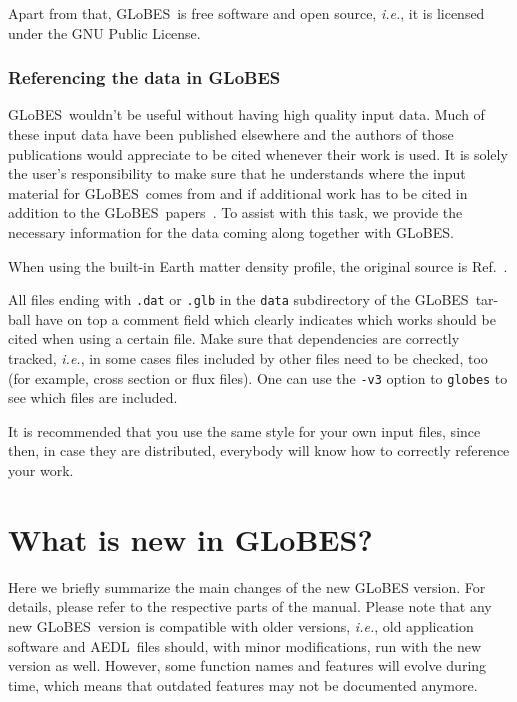 \documentclass[a4paper,12pt,twoside]{book}
\newcommand{\ie}{{\it i.e.}}
\newcommand{\Ref}{Ref.}
\newcommand{\GLOBES}{{\sf GLoBES}}
\newcommand{\AEDL}{{\sf AEDL}}
\begin{document}
Apart from that, \GLOBES\ is free software and open source, \ie, it is 
licensed under the GNU Public License.

\subsection*{Referencing the data in \GLOBES}
\label{ref_data}

\index{norm}{Referencing!data in \GLOBES}
\GLOBES\ wouldn't be useful without having high quality input data.
Much of these input data have been published elsewhere and the authors
of those publications would appreciate to be cited whenever their work
is used. It is solely the user's responsibility 
to make sure that he understands where the input material for \GLOBES\ comes
from and if additional work has to be cited in addition to the 
\GLOBES\ papers~\cite{globes_paper,globes_paper_two}. To assist with this task, we provide  the necessary information for the data coming along together with \GLOBES.

When using the built-in Earth matter density profile, the 
original source is \Ref~\cite{Stacey}.

All files ending with \verb+.dat+ or \verb+.glb+ 
in the \verb+data+ subdirectory of the \GLOBES\ tar-ball have on top a comment field which clearly indicates which works should be
cited when using a certain file. Make sure that dependencies are correctly
tracked, \ie , in some cases files included by other files need to be 
checked, too (for example, cross section or flux files). One can use 
the \verb+-v3+ option to \verb+globes+ to see which files
are included.

It is recommended that you use the same style for your own input files, since then, in case they are distributed, everybody will know how to correctly reference your work.

\chapter*{What is new in \GLOBES ?}

Here we briefly summarize the main changes of the new GLoBES version. For details, please
refer to the respective parts of the manual. Please note that any new \GLOBES\ version is
compatible with older versions, \ie, old application software and \AEDL\ files should, with minor
modifications, run with the new version as well.  However, some function names and features will
evolve during time, which means that outdated features may not be documented anymore.
\end{document}
